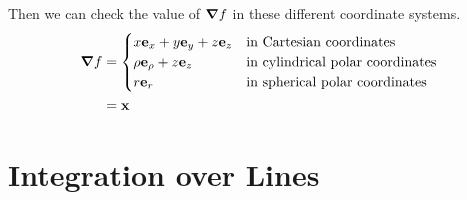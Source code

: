 \documentclass{article}
\begin{document}
Then we can check the value of $\grad f$ in these different coordinate systems.
\begin{align*}
    \grad f & = \begin{cases}
        x \vb e_x + y \vb e_y + z \vb e_z & \text{in Cartesian coordinates}         \\
        \rho \vb e_\rho + z \vb e_z       & \text{in cylindrical polar coordinates} \\
        r \vb e_r                         & \text{in spherical polar coordinates}   \\
    \end{cases} \\
            & = \vb x
\end{align*}

\section{Integration over Lines}
\end{document}
